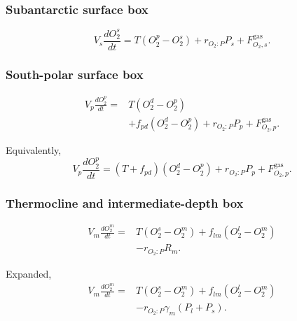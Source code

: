 \documentclass[11pt]{article}
\begin{document}
\subsubsection{Subantarctic surface box}

\begin{equation}
V_s\frac{dO_2^s}{dt}
=
T
\left(
O_2^p-O_2^s
\right)
+
r_{O_2:P}P_s
+
F^{\mathrm{gas}}_{O_2,s}.
\label{eq:seven_o2_s}
\end{equation}

\subsubsection{South-polar surface box}

\begin{equation}
\begin{split}
V_p\frac{dO_2^p}{dt}
={}&
T
\left(
O_2^d-O_2^p
\right)
\\
&+
f_{pd}
\left(
O_2^d-O_2^p
\right)
+
r_{O_2:P}P_p
+
F^{\mathrm{gas}}_{O_2,p}.
\end{split}
\label{eq:seven_o2_p}
\end{equation}

Equivalently,
\begin{equation}
V_p\frac{dO_2^p}{dt}
=
\left(T+f_{pd}\right)
\left(
O_2^d-O_2^p
\right)
+
r_{O_2:P}P_p
+
F^{\mathrm{gas}}_{O_2,p}.
\label{eq:seven_o2_p_compact}
\end{equation}

\subsubsection{Thermocline and intermediate-depth box}

\begin{equation}
\begin{split}
V_m\frac{dO_2^m}{dt}
={}&
T
\left(
O_2^s-O_2^m
\right)
+
f_{lm}
\left(
O_2^l-O_2^m
\right)
\\
&-
r_{O_2:P}R_m.
\end{split}
\label{eq:seven_o2_m}
\end{equation}

Expanded,
\begin{equation}
\begin{split}
V_m\frac{dO_2^m}{dt}
={}&
T
\left(
O_2^s-O_2^m
\right)
+
f_{lm}
\left(
O_2^l-O_2^m
\right)
\\
&-
r_{O_2:P}
\gamma_m
\left(
P_l+P_s
\right).
\end{split}
\label{eq:seven_o2_m_expanded}
\end{equation}
\end{document}
